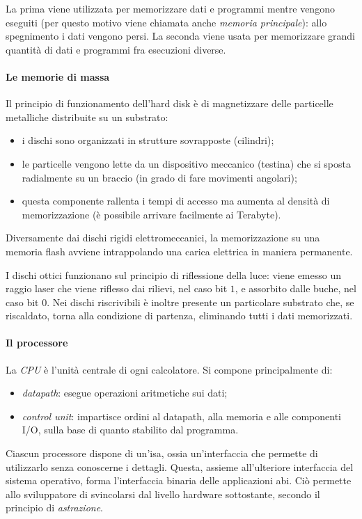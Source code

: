 \documentclass[class=book, crop=false, oneside]{standalone}
\begin{document}
La prima viene utilizzata per memorizzare dati e programmi mentre vengono eseguiti (per questo motivo viene chiamata anche \emph{memoria principale}): allo spegnimento i dati vengono persi.
La seconda viene usata per memorizzare grandi quantità di dati e programmi fra esecuzioni diverse.

\paragraph{Le memorie di massa}
Il principio di funzionamento dell'hard disk è di magnetizzare delle particelle metalliche distribuite su un substrato:
\begin{itemize}[noitemsep]
	\item i dischi sono organizzati in strutture sovrapposte (cilindri);
	\item le particelle vengono lette da un dispositivo meccanico (testina) che si sposta radialmente su un braccio (in grado di fare movimenti angolari);
	\item questa componente rallenta i tempi di accesso ma aumenta al densità di memorizzazione (è possibile arrivare facilmente ai Terabyte).
\end{itemize}

Diversamente dai dischi rigidi elettromeccanici, la memorizzazione su una memoria flash avviene intrappolando una carica elettrica in maniera permanente.

I dischi ottici funzionano sul principio di riflessione della luce: viene emesso un raggio laser che viene riflesso dai rilievi, nel caso bit \(1\), e assorbito dalle buche, nel caso bit \(0\).
Nei dischi riscrivibili è inoltre presente un particolare substrato che, se riscaldato, torna alla condizione di partenza, eliminando tutti i dati memorizzati.

\paragraph*{Il processore}
La \emph{CPU} è l'unità centrale di ogni calcolatore. Si compone principalmente di:
\begin{itemize}[noitemsep]
	\item \emph{datapath}: esegue operazioni aritmetiche sui dati;
	\item \emph{control unit}: impartisce ordini al datapath, alla memoria e alle componenti I/O, sulla base di quanto stabilito dal programma.
\end{itemize}
Ciascun processore dispone di un'\acrfull{isa}, ossia un'interfaccia che permette di utilizzarlo senza conoscerne i dettagli.
Questa, assieme all'ulteriore interfaccia del sistema operativo, forma l'interfaccia binaria delle applicazioni \acrfull{abi}.
Ciò permette allo sviluppatore di svincolarsi dal livello hardware sottostante, secondo il principio di \emph{astrazione}.
\end{document}
